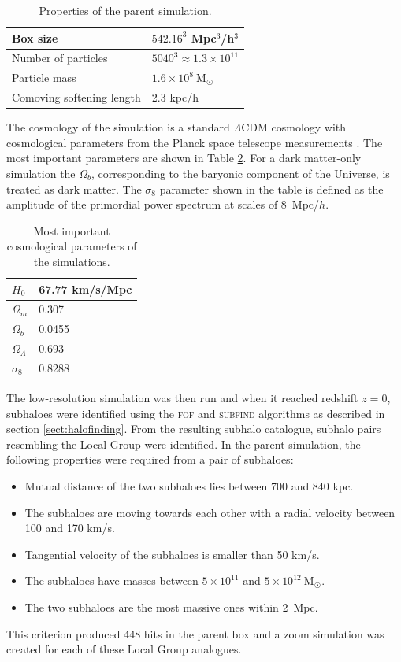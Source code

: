 \documentclass[english, twoside]{HYgradu}
\begin{document}
\begin{table}
	\centering
	\begin{tabular}{| l | l |}
		\hline
		Box size & $542.16^3$ Mpc$^3$/h$^3$ \\ \hline
		Number of particles & $5040^3 \approx 1.3 \times 10^{11}$ \\ \hline
		Particle mass & $1.6 \times 10^8~\mathrm{M_{\astrosun}}$ \\ \hline
		Comoving softening length & 2.3 kpc/h \\ \hline
	\end{tabular}
	\caption{Properties of the parent simulation.} \label{tab:parentBox}
\end{table}

The cosmology of the simulation is a standard $\Lambda$CDM cosmology with cosmological parameters from the Planck space telescope measurements \citep{planck2014resultsXVI}. The most important parameters are shown in Table \ref{tab:cosmopars}. For a dark matter-only simulation the $\Omega_b$, corresponding to the baryonic component of the Universe, is treated as dark matter. The $\sigma_8$ parameter shown in the table is defined as the amplitude of the primordial power spectrum at scales of 8~Mpc/$h$.

\begin{table}
	\centering
	\begin{tabular}{| l | l |}
		\hline
		$H_0$ & 67.77 km/s/Mpc\\ \hline
		$\Omega_m$ & 0.307 \\ \hline
		$\Omega_b$ & 0.0455 \\ \hline
		$\Omega_\Lambda$ & 0.693 \\ \hline
		$\sigma_8$ & 0.8288 \\ \hline
	\end{tabular}
	\caption{Most important cosmological parameters of the simulations.} \label{tab:cosmopars}
\end{table}

The low-resolution simulation was then run and when it reached redshift $z=0$, subhaloes were identified using the \textsc{fof} and \textsc{subfind} algorithms as described in section \ref{sect:halofinding}. From the resulting subhalo catalogue, subhalo pairs resembling the Local Group were identified. In the parent simulation, the following properties were required from a pair of subhaloes:
\begin{itemize}
\item Mutual distance of the two subhaloes lies between 700 and 840 kpc.
\item The subhaloes are moving towards each other with a radial velocity between 100 and 170 km/s.
\item Tangential velocity of the subhaloes is smaller than 50 km/s.
\item The subhaloes have masses between $5 \times 10^{11}$ and $5 \times 10^{12}~\mathrm{M}_{\astrosun}$.
\item The two subhaloes are the most massive ones within 2~Mpc.
\end{itemize}
This criterion produced 448 hits in the parent box and a zoom simulation was created for each of these Local Group analogues.
\end{document}
